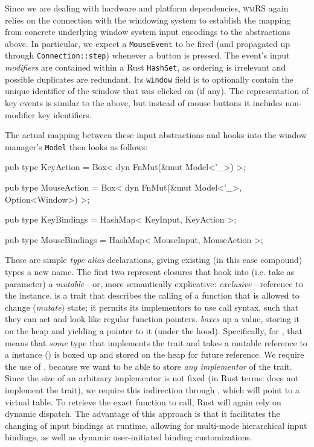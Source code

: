 Since we are dealing with hardware and platform dependencies, \textsc{wmRS}
again relies on the connection with the windowing system to establish the
mapping from concrete underlying window system input encodings to the
abstractions above. In particular, we expect a \texttt{MouseEvent} to be
fired (and propagated up through \texttt{Connection::step}) whenever a
button is pressed. The event's input \textit{modifiers} are contained within
a Rust \texttt{HashSet}, as ordering is irrelevant and possible duplicates
are redundant. Its \texttt{window} field is to optionally contain the unique
identifier of the window that was clicked on (if any). The representation of
key events is similar to the above, but instead of mouse buttons it includes
non-modifier key identifiers.

The actual mapping between these input abstractions and hooks into the window
manager's \texttt{Model} then looks as follows:

\begin{rustblock}
  pub type KeyAction = Box<
    dyn FnMut(&mut Model<'_>)
  >;
\end{rustblock}
\begin{rustblock}
  pub type MouseAction = Box<
    dyn FnMut(&mut Model<'_>, Option<Window>)
  >;
\end{rustblock}
\begin{rustblock}
  pub type KeyBindings = HashMap<
    KeyInput, KeyAction
  >;
\end{rustblock}
\begin{rustblock}
  pub type MouseBindings = HashMap<
    MouseInput, MouseAction
  >;
\end{rustblock}

These are simple \textit{type alias} declarations, giving existing (in this case
compound) types a new name. The first two represent closures that hook into
(i.e. take as parameter) a \textit{mutable}---or, more semantically explicative:
\textit{exclusive}---reference to the  instance\cite{therustbook}.
 is a trait that describes the calling of a function that is
allowed to change (\textit{mutate}) state; it permits its implementors to use
call syntax, such that they can act and look like regular function pointers.
 \textit{boxes} up a value, storing it on the heap and yielding a
pointer to it (under the hood). Specifically, for , that means
that \textit{some} type that implements the  trait and takes a
mutable reference to a  instance ()
is boxed up and stored on the heap for future reference. We require the use
of , because we want to be able to store \textit{any implementor}
of the  trait. Since the size of an arbitrary implementor is
not fixed (in Rust terms:  does not implement the 
trait), we require this indirection through , which will point to a
virtual table. To retrieve the exact function to call, Rust will again rely
on dynamic dispatch\cite{rustclosureshard}. The advantage of this approach
is that it facilitates the changing of input bindings at runtime, allowing
for multi-mode hierarchical input bindings, as well as dynamic user-initiated
binding customizations.

